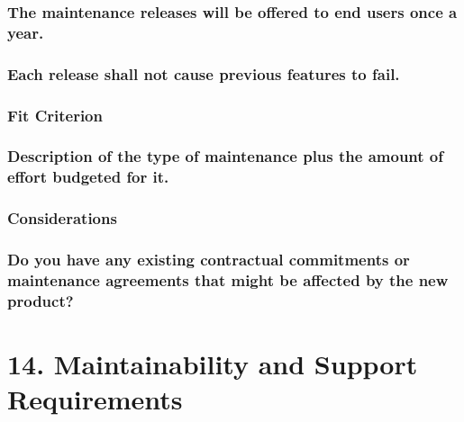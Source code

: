 \documentclass[
]{article}
\begin{document}
\hypertarget{the-maintenance-releases-will-be-offered-to-end-users-once-a-year.}{%
\subsubsection{The maintenance releases will be offered to end users
once a
year.}\label{the-maintenance-releases-will-be-offered-to-end-users-once-a-year.}}

\hypertarget{each-release-shall-not-cause-previous-features-to-fail.}{%
\subsubsection{Each release shall not cause previous features to
fail.}\label{each-release-shall-not-cause-previous-features-to-fail.}}

\hypertarget{fit-criterion-9}{%
\subsubsection{Fit Criterion}\label{fit-criterion-9}}

\hypertarget{description-of-the-type-of-maintenance-plus-the-amount-of-effort-budgeted-for-it.}{%
\subsubsection{Description of the type of maintenance plus the amount of
effort budgeted for
it.}\label{description-of-the-type-of-maintenance-plus-the-amount-of-effort-budgeted-for-it.}}

\hypertarget{considerations-32}{%
\subsubsection{Considerations}\label{considerations-32}}

\hypertarget{do-you-have-any-existing-contractual-commitments-or-maintenance-agreements-that-might-be-affected-by-the-new-product}{%
\subsubsection{Do you have any existing contractual commitments or
maintenance agreements that might be affected by the new
product?}\label{do-you-have-any-existing-contractual-commitments-or-maintenance-agreements-that-might-be-affected-by-the-new-product}}

\hypertarget{maintainability-and-support-requirements}{%
\section{14. Maintainability and Support
Requirements}\label{maintainability-and-support-requirements}}
\end{document}
